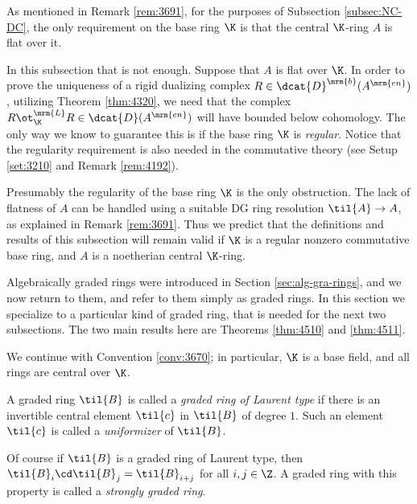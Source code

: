 \begin{rem} \label{rem:4455}
As mentioned in Remark \ref{rem:3691}, for the purposes of Subsection 
\ref{subsec:NC-DC}, the only requirement on the base ring $\K$ is that the 
central $\K$-ring $A$ is flat over it. 

In this subsection that is not enough. Suppose that $A$ is flat over $\K$.
In order to prove the uniqueness of a 
rigid dualizing complex $R \in \dcat{D}^{\mrm{b}}(A^{\mrm{en}})$,
utilizing Theorem \ref{thm:4320}, we need that the complex 
$R \ot^{\mrm{L}}_{\K} R \in \dcat{D}(A^{\mrm{en}})$ 
will have bounded below cohomology. The only way we know to guarantee this is 
if the base ring $\K$ is {\em regular}. Notice that the regularity requirement 
is also needed in the commutative theory (see Setup \ref{set:3210} and Remark 
\ref{rem:4192}). 

Presumably the regularity of the base ring $\K$ is the only obstruction.
The lack of flatness of $A$ can be handled using a suitable DG ring resolution 
$\til{A} \to A$, as explained in Remark \ref{rem:3691}.
Thus we predict that the definitions and results of this subsection will remain 
valid if $\K$ is a regular nonzero commutative base ring, and $A$ is a 
noetherian central $\K$-ring. 
\end{rem}




\label{subsec:str-gr-rings}

Algebraically graded rings were introduced in Section 
\ref{sec:alg-gra-rings}, 
and we now return to them, and refer to them simply as graded rings. 
In this section we specialize to a particular kind of graded ring, that is 
needed for the next two subsections. 
The two main results here are Theorems \ref{thm:4510} and \ref{thm:4511}. 

We continue with Convention \ref{conv:3670}; in particular, $\K$ is a base 
field, and all rings are central over $\K$.

\begin{dfn} \label{dfn:4510}
A graded ring $\til{B}$ is called a {\em graded ring of Laurent type} 
if there is an invertible central element $\til{c}$ in $\til{B}$ of degree $1$. 
Such an element $\til{c}$ is called a {\em uniformizer} of $\til{B}$. 
\end{dfn}

Of course if $\til{B}$ is a graded ring of Laurent type, then 
$\til{B}_i \cd \til{B}_j = \til{B}_{i + j}$
for all $i, j \in \Z$. A graded ring with this property is called a 
{\em strongly graded ring}. 

